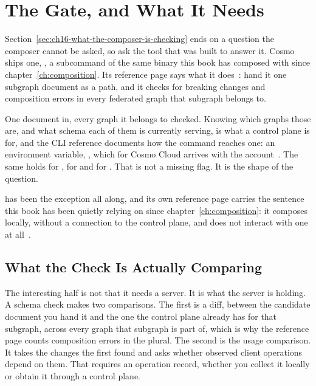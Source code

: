 \section{The Gate, and What It Needs}
\label{sec:ch16-the-gate-and-what-it-needs}

%
Section~\ref{sec:ch16-what-the-composer-is-checking} ends on a question the
composer cannot be asked, so ask the tool that was built to answer it. Cosmo
ships one, , a subcommand of the same binary this
book has composed with since chapter~\ref{ch:composition}. Its reference page
says what it does~\autocite{cosmoclicheck}: hand it one subgraph document as a
path, and it checks for breaking changes and composition errors in every
federated graph that subgraph belongs to.

%
One document in, every graph it belongs to checked. Knowing which graphs those
are, and what schema each of them is currently serving, is what a control plane
is for, and the CLI reference documents how the command reaches one: an
environment variable, , which for Cosmo Cloud arrives with
the account~\autocite{cosmocli}. The same holds for ,
for  and for . That is
not a missing flag. It is the shape of the question.

%
 has been the exception all along, and its own
reference page carries the sentence this book has been quietly relying on since
chapter~\ref{ch:composition}: it composes locally, without a connection to the
control plane, and does not interact with one at all~\autocite{cosmocompose}.

\subsection{What the Check Is Actually Comparing}

%
The interesting half is not that it needs a server. It is what the server is
holding. A schema check makes two comparisons. The first is a diff, between
the candidate document you hand it and the one the control plane already has
for that subgraph, across every graph that subgraph is part of, which is why
the reference page counts composition errors in the plural. The second is the
usage comparison. It takes the changes the first found and asks whether
observed client operations depend on them. That requires an operation record,
whether you collect it locally or obtain it through a control plane.

